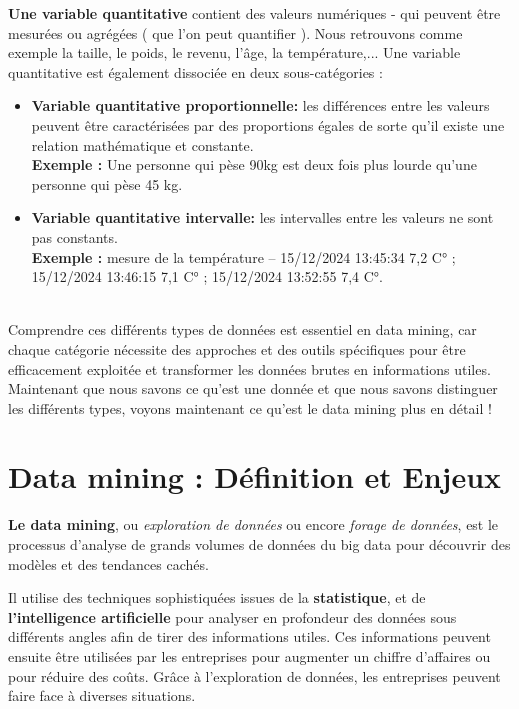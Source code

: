 \documentclass[a4paper,12pt]{report}
\begin{document}
           \textbf{Une variable quantitative} contient des valeurs numériques - qui peuvent être mesurées ou agrégées ( que l'on peut quantifier ). Nous retrouvons comme exemple la taille, le poids, le revenu, l'âge, la température,...
            Une variable quantitative est également dissociée en deux sous-catégories :
            
            \begin{itemize}
                \item \textbf{Variable quantitative proportionnelle:} les différences entre les valeurs peuvent être caractérisées par des proportions égales de sorte qu'il existe une relation mathématique et constante. \\
                \textbf{Exemple :} Une personne qui pèse 90kg est deux fois plus lourde qu’une personne qui pèse 45 kg.
                \item \textbf{Variable quantitative intervalle:} les intervalles entre les valeurs ne sont pas constants. \\
                \textbf{Exemple :} mesure de la température – 15/12/2024 13:45:34 7,2 C° ; 15/12/2024 13:46:15 7,1 C° ; 15/12/2024 13:52:55 7,4 C°.
            \end{itemize}\\
            
        Comprendre ces différents types de données est essentiel en data mining, car chaque catégorie nécessite des approches et des outils spécifiques pour être efficacement exploitée et transformer les données brutes en informations utiles. \\
        
        Maintenant que nous savons ce qu’est une donnée et que nous savons distinguer les différents types, voyons maintenant ce qu’est le data mining plus en détail !
    

    \section{Data mining : Définition et Enjeux}
        \textbf{Le data mining}, ou \textit{exploration de données} ou encore \textit{forage de données}, est le processus d'analyse de grands volumes de données du big data pour découvrir des modèles et des tendances cachés. 

        Il utilise des techniques sophistiquées issues de la \textbf{statistique}, et de \textbf{l'intelligence artificielle} pour analyser en profondeur des données sous différents angles afin de tirer des informations utiles. Ces informations peuvent ensuite être utilisées par les entreprises pour augmenter un chiffre d’affaires ou pour réduire des coûts.
        Grâce à l'exploration de données, les entreprises peuvent faire face à diverses situations.  
\end{document}
